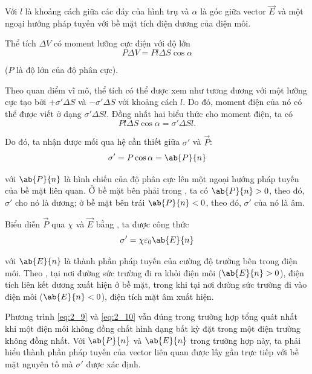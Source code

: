 \noindent
Với $l$ là khoảng cách giữa các đáy của hình trụ và $\alpha$ là góc giữa vector $\vec{E}$ và một ngoại hướng pháp tuyến với bề mặt tích điện dương của điện môi.

Thể tích $\Delta{V}$ có moment lưỡng cực điện với độ lớn
\begin{equation*}
    P\Delta{V} = Pl\Delta{S}\cos\alpha
\end{equation*}

\noindent
($P$ là độ lớn của độ phân cực).

Theo quan điểm vĩ mô, thể tích có thể được xem như tương đương với một lưỡng cực tạo bởi $+\sigma'\Delta{S}$ và $-\sigma'\Delta{S}$ với khoảng cách $l$. Do đó, moment điện của nó có thể được viết ở dạng $\sigma'\Delta{S}l$. Đồng nhất hai biểu thức cho moment điện, ta có
\begin{equation*}
    Pl\Delta{S}\cos\alpha = \sigma'\Delta{S}l.
\end{equation*}

\noindent
Do đó, ta nhận được mối qua hệ cần thiết giữa $\sigma'$ và $\vec{P}$:
\begin{equation}\label{eq:2_9}
    \sigma' = P \cos\alpha = \ab{P}{n}
\end{equation}

\noindent
với $\ab{P}{n}$ là hình chiếu của độ phân cực lên một ngoại hướng pháp tuyến của bề mặt liên quan. Ở bề mặt bên phải trong , ta có $\ab{P}{n}>0$, theo đó, $\sigma'$ cho nó là dương; ở bề mặt bên trái $\ab{P}{n}<0$, theo đó, $\sigma'$ của nó là âm.

Biểu diễn $\vec{P}$ qua $\chi$ và $\vec{E}$ bằng , ta được công thức
\begin{equation}\label{eq:2_10}
    \sigma' = \chi \varepsilon_0 \ab{E}{n}
\end{equation}

\noindent
với $\ab{E}{n}$ là thành phần pháp tuyến của cường độ trường bên trong điện môi. Theo , tại nơi đường sức trường đi ra khỏi điện môi ($\ab{E}{n}>0$), điện tích liên kết dương xuất hiện ở bề mặt, trong khi tại nơi đường sức trường đi vào  điện môi ($\ab{E}{n}<0$), điện tích mặt âm xuất hiện.

Phương trình \eqref{eq:2_9} và \eqref{eq:2_10} vẫn đúng trong trường hợp tổng quát nhất khi một điện môi không đồng chất hình dạng bất kỳ đặt trong một điện trường không đồng nhất. Với $\ab{P}{n}$ và $\ab{E}{n}$ trong trường hợp này, ta phải hiểu thành phần pháp tuyến của vector liên quan được lấy gần trực tiếp với bề mặt nguyên tố mà $\sigma'$ được xác định.

